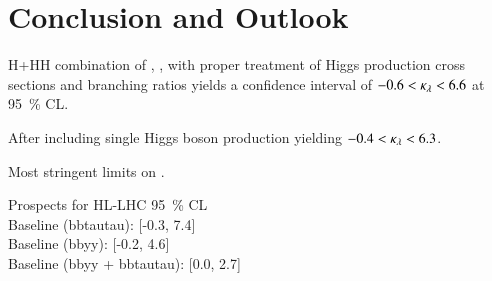\section{Conclusion and Outlook}%
\label{sec:reinterpretation_conclusion}


H+HH combination of \bbbb, \bbtautau, \bbyy with proper treatment of
Higgs production cross sections and branching ratios yields a
confidence interval of $-0.6 < \kappa_{\lambda} < 6.6$ at \SI{95}{\percent}
CL.

After including single Higgs boson production yielding
$-0.4 < \kappa_{\lambda} < 6.3$.

Most stringent limits on \klambda.


Prospects for HL-LHC \SI{95}{\percent} CL\\
Baseline (bbtautau): [-0.3, 7.4]\\
Baseline (bbyy): [-0.2, 4.6]\\
Baseline (bbyy + bbtautau): [0.0, 2.7]












